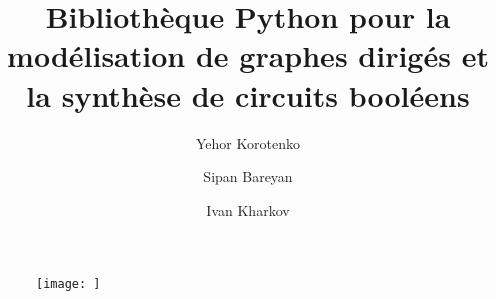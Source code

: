 \documentclass[tikz, border=10pt, 12pt]{article}
\title{Bibliothèque Python pour la modélisation de graphes dirigés et la synthèse de circuits booléens}
\author{Yehor Korotenko \and Sipan Bareyan \and Ivan Kharkov}
\date{}
\begin{document}
\begin{figure}[H]
    \centering
    \texttt{[image: ]}
    \caption{}
    \label{fig:}
\end{figure}
\end{document}
